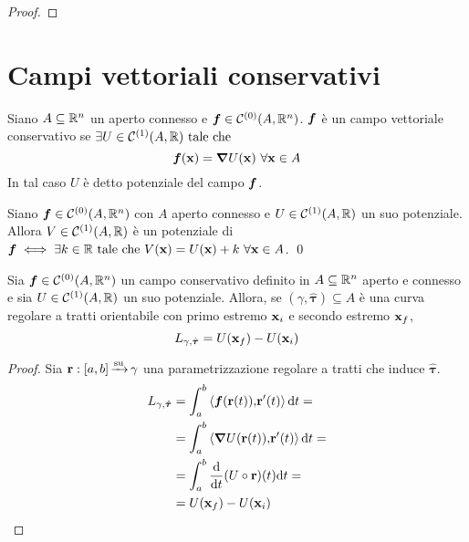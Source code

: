 \begin{proof}
\end{proof}

\section{Campi vettoriali conservativi}

\begin{definition}
	Siano $A \subseteq \mathbb{R}^n$ un aperto connesso e $\bm f \in \mathcal{C}^{(0)}(A,\mathbb{R}^n)$. $\bm f$ è un campo vettoriale conservativo se $\exists U \in \mathcal{C}^{(1)}(A,\mathbb{R}) \text{ tale che }$
	$$
		\vecf(\vb{x})=\grad U(\vb{x}) \ \forall \vb{x} \in A
	$$
	In tal caso $U$ è detto potenziale del campo $\bm f$.
\end{definition}

\begin{prop}
	Siano $\bm f \in \mathcal{C}^{(0)}(A,\mathbb{R}^n)$ con $A$ aperto connesso e $U \in \mathcal{C}^{(1)}(A,\mathbb{R})$ un suo potenziale. Allora $V\in \mathcal{C}^{(1)}(A,\mathbb{R})$ è un potenziale di $\bm f \iff \exists k \in \mathbb{R} \text{ tale che } V(\vb{x})=U(\vb{x}) + k \ \forall \vb{x} \in A$.
	\qed
\end{prop}

\begin{theorem}
	\label{thm:cvc_work}
	Sia $\bm f \in \mathcal{C}^{(0)}(A,\mathbb{R}^n)$ un campo conservativo definito in $A\subseteq\mathbb{R}^n$ aperto e connesso e sia $U \in \mathcal{C}^{(1)}(A,\mathbb{R})$ un suo potenziale. Allora, se $(\gamma,\hat{\bm\tau}) \subseteq A$ è una curva regolare a tratti orientabile con primo estremo $\vb{x}_i$ e secondo estremo $\vb{x}_f$,
	$$
		L_{\gamma, \hat{\bm\tau}}=U(\vb{x}_f)-U(\vb{x}_i)
	$$
\end{theorem}

\begin{proof}
	Sia $\vb{r}:[a,b]\operatorname{\xrightarrow{\operatorname{su}}}\gamma$ una parametrizzazione regolare a tratti che induce $\hat{\bm\tau}$.
	\begin{align*}
		L_{\gamma,\hat{\bm\tau}}
		&=\int_{a}^{b}\left\langle\bm f (\vb{r}(t)){,}\vb{r}'(t)\right\rangle\dd t=\\
		&=\int_{a}^{b}\left\langle\grad U (\vb{r}(t)){,}\vb{r}'(t)\right\rangle\dd t=\\
		&=\int_{a}^{b}\frac{\dd}{\dd t}(U\circ \vb{r})(t)\dd t=\\
		&=U(\vb{x}_f)-U(\vb{x}_i)
	\end{align*}
\end{proof}

